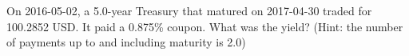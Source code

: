 On 2016-05-02, a 5.0-year Treasury that matured on 2017-04-30 traded for 100.2852 USD. It paid a 0.875\% coupon. What was the yield? (Hint: the number of payments up to and including maturity is 2.0)
